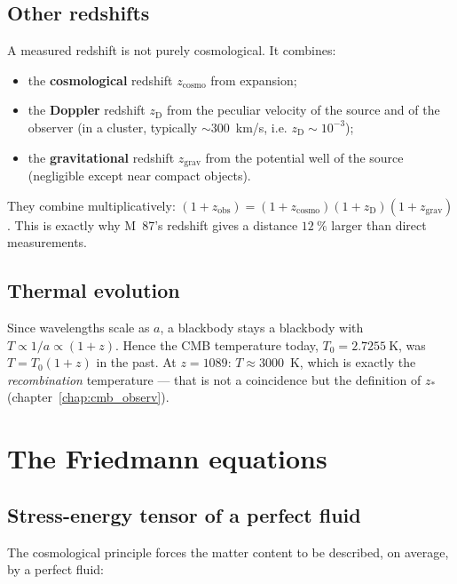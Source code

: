 \documentclass[11pt,a4paper,openany]{report}
\begin{document}
\section{Other redshifts}

A measured redshift is not purely cosmological. It combines:
\begin{itemize}[topsep=2pt]
\item the \textbf{cosmological} redshift $z_{\text{cosmo}}$ from expansion;
\item the \textbf{Doppler} redshift $z_{\text{D}}$ from the peculiar velocity of
  the source and of the observer (in a cluster, typically $\sim 300$~km/s, i.e.
  $z_{\mathrm{D}}\sim 10^{-3}$);
\item the \textbf{gravitational} redshift $z_{\text{grav}}$ from the potential
  well of the source (negligible except near compact objects).
\end{itemize}
They combine multiplicatively:
$(1+z_{\text{obs}}) = (1+z_{\text{cosmo}})(1+z_{\text{D}})(1+z_{\text{grav}})$.
This is exactly why M~87's redshift gives a distance $12~\%$ larger than direct
measurements.

\section{Thermal evolution}

Since wavelengths scale as $a$, a blackbody stays a blackbody with
$T \propto 1/a \propto (1+z)$. Hence the CMB temperature today,
$T_{0} = \SI{2.7255}{\kelvin}$, was $T = T_0 (1+z)$ in the past. At $z=1089$:
$T \approx 3000$~K, which is exactly the \emph{recombination} temperature ---
that is not a coincidence but the definition of $z_{*}$
(chapter~\ref{chap:cmb_observ}).

\chapter{The Friedmann equations}
\label{chap:friedmann}

\section{Stress-energy tensor of a perfect fluid}

The cosmological principle forces the matter content to be described, on
average, by a perfect fluid:
\end{document}
